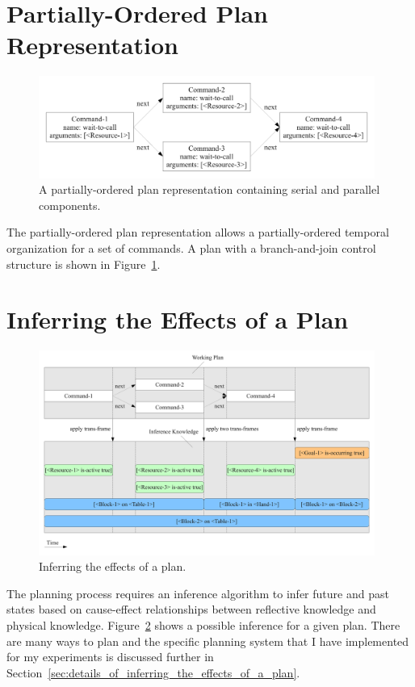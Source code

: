 \section{Partially-Ordered Plan Representation}

\begin{figure}[bth]
  \center
  \includegraphics[width=11cm]{gfx/serial_and_parallel_plan}
  \caption[A partially-ordered plan with serial and parallel
    components.]{A partially-ordered plan representation containing
    serial and parallel components.}
  \label{fig:serial_and_parallel_plan}
\end{figure}

The partially-ordered plan representation allows a partially-ordered
temporal organization for a set of commands.  A plan with a
branch-and-join control structure is shown in
Figure~\ref{fig:serial_and_parallel_plan}.


\section{Inferring the Effects of a Plan}
\label{sec:inferring_the_effects_of_a_plan}

\begin{figure}[bth]
  \center
  \includegraphics[width=11cm]{gfx/infer_plan_effects}
  \caption[Inferring the effects of a plan.]{Inferring the effects of
    a plan.}
  \label{fig:infer_plan_effects}
\end{figure}

The planning process requires an inference algorithm to infer future
and past states based on cause-effect relationships between reflective
knowledge and physical knowledge.  Figure~\ref{fig:infer_plan_effects}
shows a possible inference for a given plan.  There are many ways to
plan and the specific planning system that I have implemented for my
experiments is discussed further in
Section~\ref{sec:details_of_inferring_the_effects_of_a_plan}.


